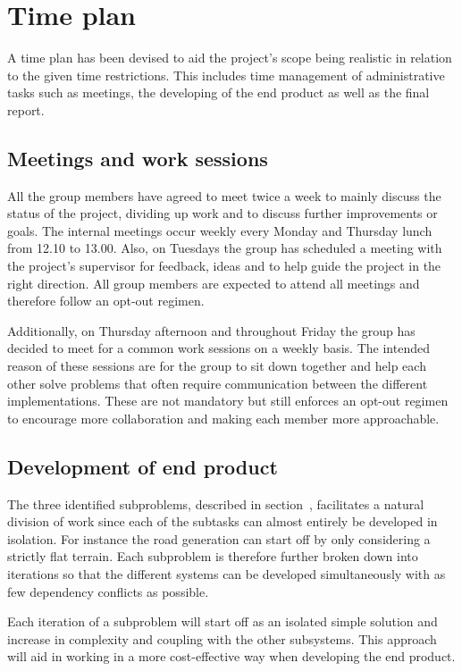 \section{Time plan}
%

A time plan has been devised to aid the project's scope being realistic in relation to the given time restrictions.
This includes time management of administrative tasks such as meetings, the developing of the end product as well as the final report.

\subsection{Meetings and work sessions}
All the group members have agreed to meet twice a week to mainly discuss the status of the project, dividing up work and to discuss further improvements or goals.
The internal meetings occur weekly every Monday and Thursday lunch from 12.10 to 13.00.
Also, on Tuesdays the group has scheduled a meeting with the project's supervisor for feedback, ideas and to help guide the project in the right direction.
All group members are expected to attend all meetings and therefore follow an opt-out regimen.

Additionally, on Thursday afternoon and throughout Friday the group has decided to meet for a common work sessions on a weekly basis.
The intended reason of these sessions are for the group to sit down together and help each other solve problems that often require communication between the different implementations.
These are not mandatory but still enforces an opt-out regimen to encourage more collaboration and making each member more approachable.

\subsection{Development of end product}
The three identified subproblems, described in section~, facilitates a natural division of work since each of the subtasks can almost entirely be developed in isolation.
For instance the road generation can start off by only considering a strictly flat terrain.
Each subproblem is therefore further broken down into iterations so that the different systems can be developed simultaneously with as few dependency conflicts as possible.

Each iteration of a subproblem will start off as an isolated simple solution and increase in complexity and coupling with the other subsystems.
This approach will aid in working in a more cost-effective way when developing the end product.

